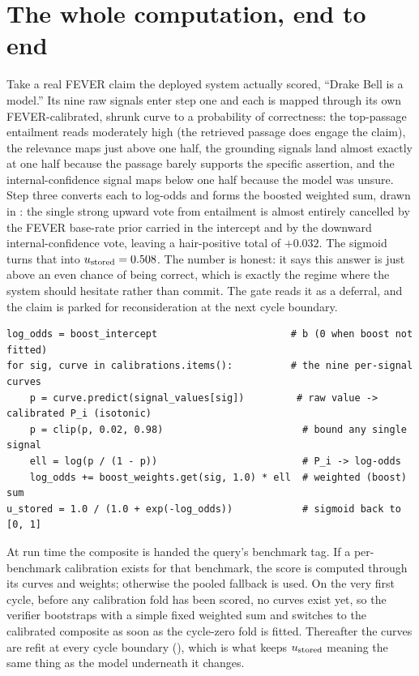 \section{The whole computation, end to end}
\label{sec:composite-worked}

\begin{workedexample}[A borderline FEVER claim becomes $\ustored = 0.508$]
Take a real FEVER claim the deployed system actually scored, ``Drake Bell is a
model.'' Its nine raw signals enter step one and each is mapped through its own
FEVER-calibrated, shrunk curve to a probability of correctness: the top-passage
entailment reads moderately high (the retrieved passage does engage the claim), the
relevance maps just above one half, the grounding signals land almost exactly at one
half because the passage barely supports the specific assertion, and the
internal-confidence signal maps below one half because the model was unsure. Step
three converts each to log-odds and forms the boosted weighted sum, drawn in
: the single strong upward vote from entailment is almost entirely
cancelled by the FEVER base-rate prior carried in the intercept and by the downward
internal-confidence vote, leaving a hair-positive total of $+0.032$. The sigmoid turns
that into $\ustored = 0.508$. The number is honest: it says this answer is just above
an even chance of being correct, which is exactly the regime where the system should
hesitate rather than commit. The gate reads it as a deferral, and the claim is parked
for reconsideration at the next cycle boundary.
\end{workedexample}

\begin{lstlisting}[caption={The composite score, condensed from \texttt{caem/verification/cal\_prob\_composite.py}.}, label={lst:composite}]
log_odds = boost_intercept                       # b (0 when boost not fitted)
for sig, curve in calibrations.items():          # the nine per-signal curves
    p = curve.predict(signal_values[sig])         # raw value -> calibrated P_i (isotonic)
    p = clip(p, 0.02, 0.98)                        # bound any single signal
    ell = log(p / (1 - p))                         # P_i -> log-odds
    log_odds += boost_weights.get(sig, 1.0) * ell  # weighted (boost) sum
u_stored = 1.0 / (1.0 + exp(-log_odds))            # sigmoid back to [0, 1]
\end{lstlisting}

\begin{fromcode}
At run time the composite is handed the query's benchmark tag. If a per-benchmark
calibration exists for that benchmark, the score is computed through its curves and
weights; otherwise the pooled fallback is used. On the very first cycle, before any
calibration fold has been scored, no curves exist yet, so the verifier bootstraps with
a simple fixed weighted sum and switches to the calibrated composite as soon as the
cycle-zero fold is fitted. Thereafter the curves are refit at every cycle boundary
(), which is what keeps $u_{\text{stored}}$ meaning the same thing as the model
underneath it changes.
\end{fromcode}

